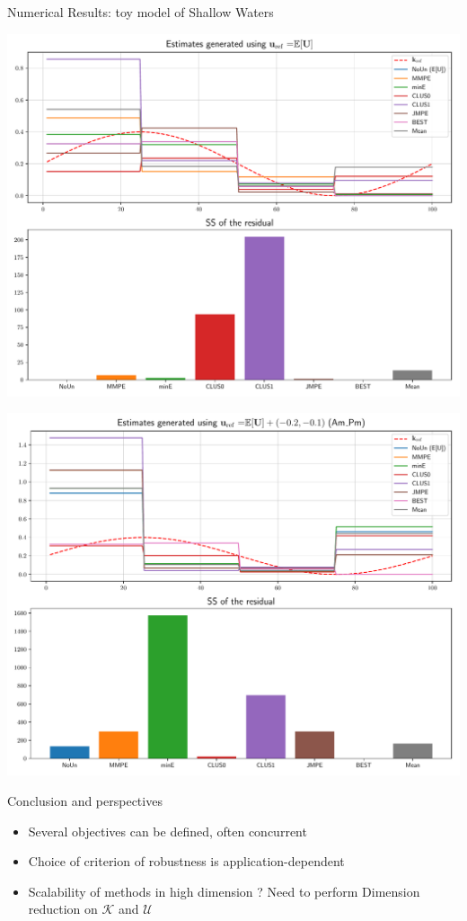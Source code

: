 \documentclass{beamer}
\newlength{\sndcolwid}
\begin{document}
\begin{frame}[t]
\begin{columns}[t]
\begin{column}{\sndcolwid}
\begin{block}{Numerical Results: toy model of Shallow Waters}
\begin{center}
    \includegraphics[width = .97\textwidth]{estimate_uref_centered.pdf}
  \end{center}
  \begin{center}
    \includegraphics[width = .97\textwidth]{estimate_uref_AmPm.pdf} 
  \end{center}
\end{block}
\vfill
\begin{block}{Conclusion and perspectives}
  \begin{itemize}
  \item Several objectives can be defined, often concurrent
  \item Choice of criterion of robustness is application-dependent
  \item Scalability of methods in high dimension ? Need to perform \alert{Dimension reduction} on $\mathcal{K}$ and  $\mathcal{U}$
  \end{itemize}
\end{block}


\end{column}
\end{columns}
\end{frame}
\end{document}
